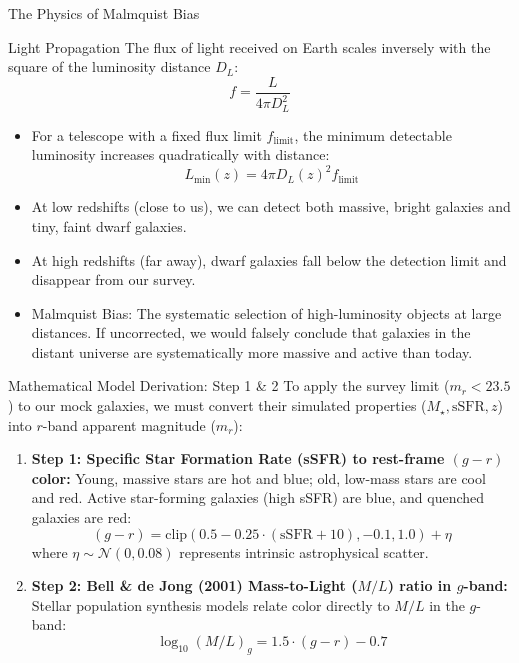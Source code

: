 \documentclass[9pt]{beamer}
\begin{document}
\begin{frame}{The Physics of Malmquist Bias}
  \begin{block}{Light Propagation}
    The flux of light received on Earth scales inversely with the square of the luminosity distance $D_L$:
    $$f = \frac{L}{4\pi D_L^2}$$
  \end{block}
  \begin{itemize}
    \item For a telescope with a fixed flux limit $f_{\text{limit}}$, the minimum detectable luminosity increases quadratically with distance:
      $$L_{\text{min}}(z) = 4\pi D_L(z)^2 f_{\text{limit}}$$
    \item At low redshifts (close to us), we can detect both massive, bright galaxies and tiny, faint dwarf galaxies.
    \item At high redshifts (far away), dwarf galaxies fall below the detection limit and disappear from our survey.
    \item \alert{Malmquist Bias:} The systematic selection of high-luminosity objects at large distances. If uncorrected, we would falsely conclude that galaxies in the distant universe are systematically more massive and active than today.
  \end{itemize}
\end{frame}

\begin{frame}{Mathematical Model Derivation: Step 1 \& 2}
  To apply the survey limit ($m_r < 23.5$) to our mock galaxies, we must convert their simulated properties ($M_\star, \text{sSFR}, z$) into $r$-band apparent magnitude ($m_r$):
  \begin{enumerate}
    \item \textbf{Step 1: Specific Star Formation Rate (sSFR) to rest-frame $(g-r)$ color:}
      Young, massive stars are hot and blue; old, low-mass stars are cool and red. Active star-forming galaxies (high sSFR) are blue, and quenched galaxies are red:
      $$(g-r) = \text{clip}(0.5 - 0.25 \cdot (\text{sSFR} + 10), -0.1, 1.0) + \eta$$
      where $\eta \sim \mathcal{N}(0, 0.08)$ represents intrinsic astrophysical scatter.
    \item \textbf{Step 2: Bell \& de Jong (2001) Mass-to-Light ($M/L$) ratio in $g$-band:}
      Stellar population synthesis models relate color directly to $M/L$ in the $g$-band:
      $$\log_{10}(M/L)_g = 1.5 \cdot (g-r) - 0.7$$
  \end{enumerate}
\end{frame}
\end{document}

